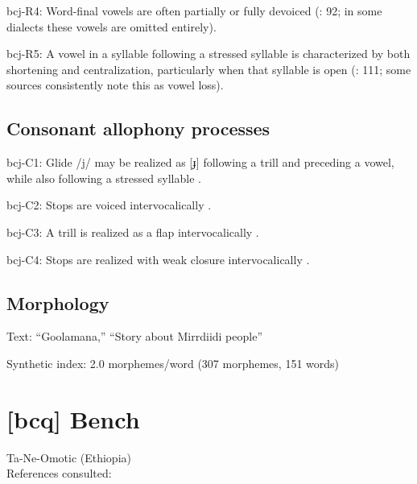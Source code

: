 {\begin{appendixdesc}
\item[bcj-R4:] Word-final vowels are often partially or fully devoiced (\citealt{Bowern2012}: 92; in some dialects these vowels are omitted entirely).

\item[bcj-R5:] A vowel in a syllable following a stressed syllable is characterized by both shortening and centralization, particularly when that syllable is open (\citealt{Bowern2012}: 111; some sources consistently note this as vowel loss).
\end{appendixdesc}
\subsection*{Consonant allophony processes}
\begin{appendixdesc}

\item[bcj-C1:] Glide /j/ may be realized as [ɟ] following a trill and preceding a vowel, while also following a stressed syllable \citep[80--81]{Bowern2012}.

\item[bcj-C2:]  Stops are voiced intervocalically \citep[76]{Bowern2012}.

\item[bcj-C3:] A trill is realized as a flap intervocalically \citep[81]{Bowern2012}.

\item[bcj-C4:] Stops are realized with weak closure intervocalically \citep[78]{Bowern2012}.
\end{appendixdesc}
\subsection*{Morphology}

\begin{appendixdesc}

\item[Text:] “Goolamana,” “Story about Mirrdiidi people” \citep[704--710]{Bowern2012}

\item[Synthetic index:] 2.0 morphemes/word (307 morphemes, 151 words)
\end{appendixdesc}
\section*{[bcq] Bench}  %
Ta-Ne-Omotic (Ethiopia)\medskip\\
References consulted: \citet{Rapold2006}

}
